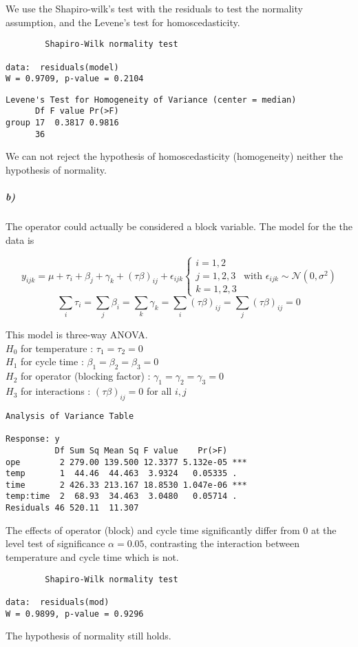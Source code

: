 \documentclass{article}
\begin{document}
We use the Shapiro-wilk's test with the residuals to test the normality assumption, and the Levene's test for homoscedasticity.
\begin{verbatim}
        Shapiro-Wilk normality test

data:  residuals(model) 
W = 0.9709, p-value = 0.2104
\end{verbatim}
\begin{verbatim}
Levene's Test for Homogeneity of Variance (center = median)
      Df F value Pr(>F)
group 17  0.3817 0.9816
      36                            
\end{verbatim}
We can not reject the hypothesis of homoscedasticity (homogeneity) neither the hypothesis of normality.
\subparagraph{b)}
The operator could actually be considered a block variable. 
The model for the the data is \begin{center}
$$
y_{ijk}=\mu +\tau_i+\beta_j+ \gamma_k + (\tau\beta)_{ij}+ \epsilon_{ijk} \left \{
    \begin{array}{ll}
        i=1,2 \\
		j=1,2,3 \\
		k=1,2,3 
    \end{array}
\right.
\text{ with } \epsilon_{ijk} \sim \mathcal{N}(0,\sigma^2)
$$
$$\sum_i\tau_i=\sum_j\beta_i=\sum_k\gamma_k=\sum_i (\tau\beta)_{ij} = \sum_j (\tau\beta)_{ij} =0$$
 
\end{center}
 This model is three-way ANOVA. \\
$H_0$ for temperature : $ \tau_1 = \tau_2 =0$\\
$H_1$ for cycle time : $ \beta_1 = \beta_2=\beta_3=0$\\
$H_2$ for operator (blocking factor) : $ \gamma_1 = \gamma_2=\gamma_3=0$\\
$H_3$ for interactions : $(\tau\beta)_{ij}=0$ for all $i,j$
\begin{verbatim}
Analysis of Variance Table

Response: y
          Df Sum Sq Mean Sq F value    Pr(>F)    
ope        2 279.00 139.500 12.3377 5.132e-05 ***
temp       1  44.46  44.463  3.9324   0.05335 .  
time       2 426.33 213.167 18.8530 1.047e-06 ***
temp:time  2  68.93  34.463  3.0480   0.05714 .  
Residuals 46 520.11  11.307                         
\end{verbatim}
The effects of operator (block) and cycle time significantly differ from 0 at the level test of significance $\alpha=0.05$, contrasting the interaction between temperature and cycle time which is not.
\begin{verbatim}
        Shapiro-Wilk normality test

data:  residuals(mod) 
W = 0.9899, p-value = 0.9296                        
\end{verbatim}
The hypothesis of normality still holds.
\end{document}

